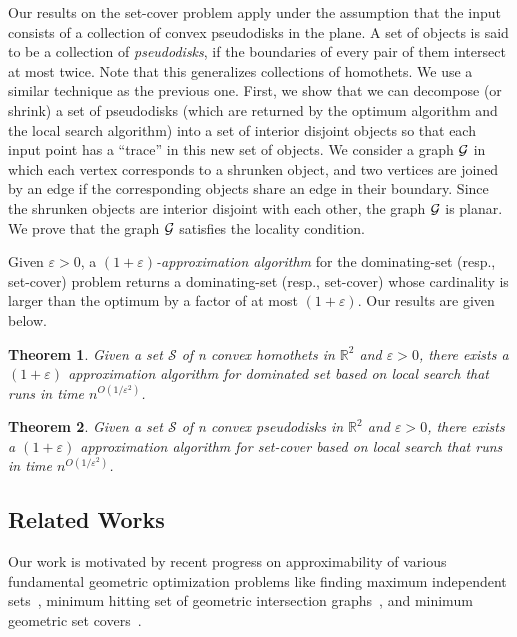 \documentclass[a4paper,11pt]{article}
\newcommand{\IR}{\mathbb{R}}
\newtheorem{theorem}{Theorem}
\begin{document}
{Our results on the set-cover problem apply under the assumption that the input consists of a collection of  convex pseudodisks in the plane.}  A set of objects is said to be a collection of \emph{pseudodisks}, if the boundaries of every pair of them intersect at most twice. Note that this generalizes collections of  homothets. We use a 
similar technique as the previous one. First, we show that we can decompose (or 
shrink) a set of  pseudodisks (which are returned by the optimum algorithm and the local search 
algorithm) into a set of interior disjoint  objects so that each input 
point has 
a ``trace'' in this new set of objects.
We consider a graph ${\cal G}$ in which each vertex corresponds to a {shrunken} 
object, and {two vertices are joined by an} edge if the corresponding objects share an edge 
in their boundary. Since the shrunken objects are interior disjoint with each 
other, the graph ${\cal G}$ is planar. We prove that the graph ${\cal G}$ 
satisfies the locality condition. 



{Given $\varepsilon > 0$, a \emph{$(1+\varepsilon)$-approximation algorithm} for the dominating-set (resp., set-cover) problem returns a dominating-set (resp., set-cover) whose cardinality is larger than the optimum by a factor of at most $(1+\varepsilon)$. Our results are given below.}

\begin{theorem}\label{Thm:DominatingSet}
{Given a set $\mathscr{S}$ of n convex homothets in $\IR^2$ and $\varepsilon > 0$, there exists a $(1+\varepsilon)$ approximation algorithm for dominated set based on local search that runs in time $n^{O(1/\varepsilon^2)}$.}
\end{theorem} 
\begin{theorem}\label{Thm:SetCover}
{Given a set $\mathscr{S}$ of n convex pseudodisks in $\IR^2$  and $\varepsilon > 0$, there exists a $(1+\varepsilon)$ approximation algorithm for set-cover based on local search that runs in time $n^{O(1/\varepsilon^2)}$.}
\end{theorem} 

\subsection{Related Works}

Our work is motivated by recent progress on approximability of various 
fundamental geometric optimization problems like finding maximum  independent 
sets~\cite{AdamaszekW14}, 
 minimum hitting set of geometric intersection graphs~\cite{MustafaR10}, and 
minimum geometric 
set 
covers~\cite{Ray}. 
\end{document}
